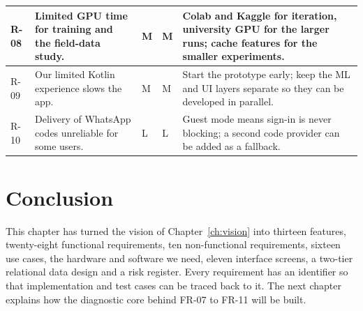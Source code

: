 {\begin{longtable}{|L{0.9cm}|L{4.2cm}|L{0.5cm}|L{0.5cm}|L{7.7cm}|}
R-08 & Limited GPU time for training and the field-data study. & M & M & Colab and Kaggle for iteration, university GPU for the larger runs; cache features for the smaller experiments. \\ \hline
R-09 & Our limited Kotlin experience slows the app. & M & M & Start the prototype early; keep the ML and UI layers separate so they can be developed in parallel. \\ \hline
R-10 & Delivery of WhatsApp codes unreliable for some users. & L & L & Guest mode means sign-in is never blocking; a second code provider can be added as a fallback. \\ \hline
\end{longtable}
}

\section{Conclusion}
This chapter has turned the vision of Chapter~\ref{ch:vision} into thirteen features, twenty-eight functional requirements, ten non-functional requirements, sixteen use cases, the hardware and software we need, eleven interface screens, a two-tier relational data design and a risk register. Every requirement has an identifier so that implementation and test cases can be traced back to it. The next chapter explains how the diagnostic core behind FR-07 to FR-11 will be built.
